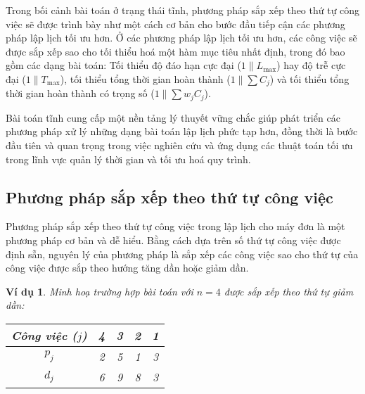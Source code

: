\documentclass[12pt,a4paper]{report}
\newtheorem{vd}{Ví dụ}
\begin{document}
Trong bối cảnh bài toán ở trạng thái tĩnh, phương pháp sắp xếp theo thứ tự công việc sẽ được trình bày như một cách cơ bản cho bước đầu tiếp cận các phương pháp lập lịch tối ưu hơn. Ở các phương pháp lập lịch tối ưu hơn, các công việc sẽ được sắp xếp sao cho tối thiểu hoá một hàm mục tiêu nhất định, trong đó bao gồm các dạng bài toán: Tối thiểu độ đáo hạn cực đại ($1\|L_{\max}$) hay độ trễ cực đại ($1\|T_{\max}$), tối thiểu tổng thời gian hoàn thành ($1\|\sum C_j$) và tối thiểu tổng thời gian hoàn thành có trọng số ($1\|\sum w_j C_j$).

Bài toán tĩnh cung cấp một nền tảng lý thuyết vững chắc giúp phát triển các phương pháp xử lý những dạng bài toán lập lịch phức tạp hơn, đồng thời là bước đầu tiên và quan trọng trong việc nghiên cứu và ứng dụng các thuật toán tối ưu trong lĩnh vực quản lý thời gian và tối ưu hoá quy trình.
\subsection{Phương pháp sắp xếp theo thứ tự công việc}
Phương pháp sắp xếp theo thứ tự công việc trong lập lịch cho máy đơn là một phương pháp cơ bản và dễ hiểu. Bằng cách dựa trên số thứ tự công việc được định sẵn, nguyên lý của phương pháp là sắp xếp các công việc sao cho thứ tự của công việc được sắp theo hướng tăng dần hoặc giảm dần.

\begin{vd}
	Minh hoạ trường hợp bài toán với $n=4$ được sắp xếp theo thứ tự giảm dần:
	\begin{table}[h!]
		\centering
		 \begin{tabular}{|c | c c c c |} 
		 \hline
		 Công việc ($j$) & 4 & 3 & 2 & 1 \\
		 \hline\hline
		 $p_j$ & 2 & 5 & 1 & 3 \\
		 $d_j$ & 6 & 9 & 8 & 3 \\
		 \hline
		 \end{tabular}
	\end{table}
\end{vd}
	
\end{document}

